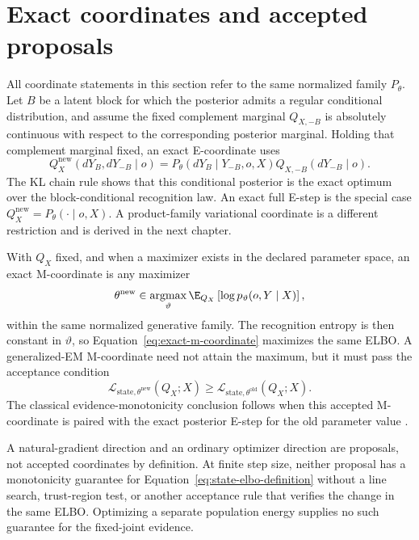 \section{Exact coordinates and accepted proposals}

All coordinate statements in this section refer to the same normalized family \(P_\theta\). Let \(B\) be a latent block for which the posterior admits a regular conditional distribution, and assume the fixed complement marginal \(Q_{X,-B}\) is absolutely continuous with respect to the corresponding posterior marginal. Holding that complement marginal fixed, an exact E-coordinate uses
\begin{equation}
Q_X^{\mathrm{new}}(dY_B,dY_{-B}\mid o)
=P_\theta(dY_B\mid Y_{-B},o,X)
Q_{X,-B}(dY_{-B}\mid o).
\label{eq:exact-e-coordinate}
\end{equation}
The KL chain rule shows that this conditional posterior is the exact optimum over the block-conditional recognition law. An exact full E-step is the special case \(Q_X^{\mathrm{new}}=P_\theta(\mathord\cdot\mid o,X)\). A product-family variational coordinate is a different restriction and is derived in the next chapter.

With \(Q_X\) fixed, and when a maximizer exists in the declared parameter space, an exact M-coordinate is any maximizer
\begin{equation}
\theta^{\mathrm{new}}
\in\operatorname*{argmax}_{\vartheta}
\E_{Q_X}\left[\log p_{\vartheta}(o,Y\mid X)\right],
\label{eq:exact-m-coordinate}
\end{equation}
within the same normalized generative family. The recognition entropy is then constant in \(\vartheta\), so Equation~\eqref{eq:exact-m-coordinate} maximizes the same ELBO. A generalized-EM M-coordinate need not attain the maximum, but it must pass the acceptance condition
\begin{equation}
\mathcal L_{\mathrm{state},\theta^{\mathrm{new}}}(Q_X;X)
\geq
\mathcal L_{\mathrm{state},\theta^{\mathrm{old}}}(Q_X;X).
\label{eq:generalized-em-acceptance}
\end{equation}
The classical evidence-monotonicity conclusion follows when this accepted M-coordinate is paired with the exact posterior E-step for the old parameter value \citep{Dempster1977,Neal1998}.

A natural-gradient direction and an ordinary optimizer direction are proposals, not accepted coordinates by definition. At finite step size, neither proposal has a monotonicity guarantee for Equation~\eqref{eq:state-elbo-definition} without a line search, trust-region test, or another acceptance rule that verifies the change in the same ELBO. Optimizing a separate population energy supplies no such guarantee for the fixed-joint evidence.
